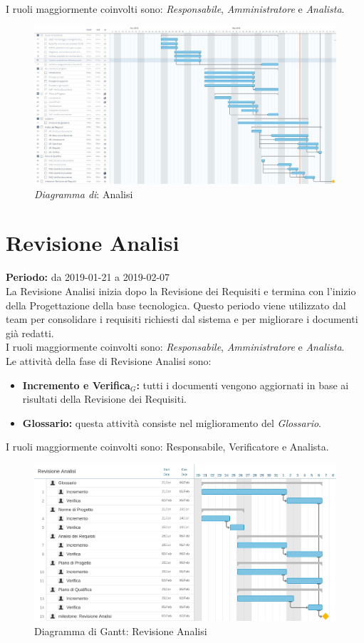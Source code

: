 I ruoli maggiormente coinvolti sono: \textit{Responsabile}, \textit{Amministratore} e \textit{Analista}.
\begin{figure} [h]
    \centering
    \includegraphics[scale=0.3]{./images/analisi.jpg}
    \caption{\textit{Diagramma di}: Analisi }\label{}
\end{figure}
\section{Revisione Analisi}
\textbf{Periodo:} da 2019-01-21 a 2019-02-07\\
La Revisione Analisi inizia dopo la Revisione dei Requisiti e termina con l’inizio della Progettazione della base tecnologica. Questo periodo viene utilizzato dal team per consolidare i requisiti richiesti dal sistema e per migliorare i documenti già redatti.\\I ruoli maggiormente coinvolti sono:  \textit{Responsabile}, \textit{Amministratore} e \textit{Analista}.\\
Le attività della fase di Revisione Analisi sono:
\begin{itemize}
    \item \textbf{Incremento e Verifica$_{G}$:} tutti i documenti vengono aggiornati in base ai risultati della Revisione dei Requisiti.
    \item \textbf{Glossario:} questa attività consiste nel miglioramento del \textit{Glossario}.
\end{itemize}
I ruoli maggiormente coinvolti sono: Responsabile, Verificatore e Analista.
\begin{figure} [h]
    \centering
    \includegraphics[scale=0.1]{./images/revisione_analisi.jpg}
    \caption{Diagramma di Gantt: Revisione Analisi }\label{}
\end{figure}

